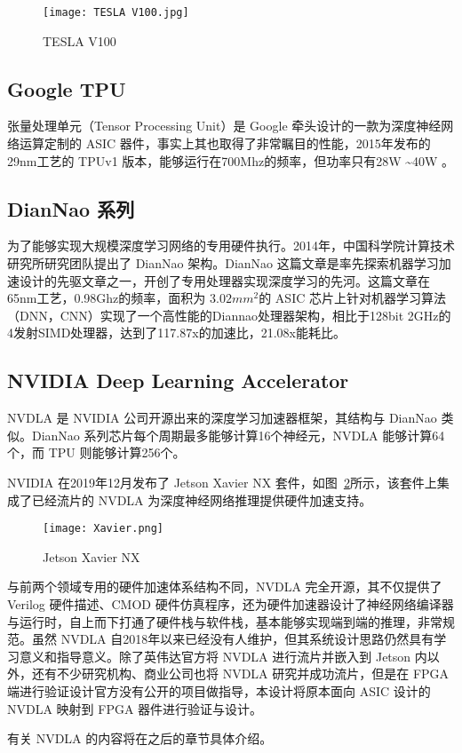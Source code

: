 \begin{figure}[!htbp]
    \centering
    \texttt{[image: TESLA V100.jpg]}
    \caption{TESLA V100}
    \label{fig:TESLA V100}
\end{figure}

\subsection{Google TPU}

张量处理单元（Tensor Processing Unit）是 Google 牵头设计的一款为深度神经网络运算定制的 ASIC 器件，事实上其也取得了非常瞩目的性能，2015年发布的29nm工艺的 TPUv1 版本，能够运行在700Mhz的频率，但功率只有28W \textasciitilde 40W \cite{DBLP:journals/corr/JouppiYPPABBBBB17}。

\subsection{DianNao 系列}

为了能够实现大规模深度学习网络的专用硬件执行。2014年，中国科学院计算技术研究所研究团队提出了 DianNao 架构。DianNao 这篇文章是率先探索机器学习加速设计的先驱文章之一，开创了专用处理器实现深度学习的先河。这篇文章在65nm工艺，0.98Ghz的频率，面积为 $ 3.02 mm^2 $的 ASIC 芯片上针对机器学习算法（DNN，CNN）实现了一个高性能的Diannao处理器架构，相比于128bit 2GHz的4发射SIMD处理器，达到了117.87x的加速比，21.08x能耗比。

\subsection{NVIDIA Deep Learning Accelerator}

NVDLA 是 NVIDIA 公司开源出来的深度学习加速器框架，其结构与 DianNao 类似。DianNao 系列芯片每个周期最多能够计算16个神经元，NVDLA 能够计算64个，而 TPU 则能够计算256个。

NVIDIA 在2019年12月发布了 Jetson Xavier NX 套件，如图~\ref{fig:Xavier NX}所示，该套件上集成了已经流片的 NVDLA 为深度神经网络推理提供硬件加速支持。

\begin{figure}[!htbp]
    \centering
    \texttt{[image: Xavier.png]}
    \caption{Jetson Xavier NX}
    \label{fig:Xavier NX}
\end{figure}

与前两个领域专用的硬件加速体系结构不同，NVDLA 完全开源，其不仅提供了 Verilog 硬件描述、CMOD 硬件仿真程序，还为硬件加速器设计了神经网络编译器与运行时，自上而下打通了硬件栈与软件栈，基本能够实现端到端的推理，非常规范。虽然 NVDLA 自2018年以来已经没有人维护，但其系统设计思路仍然具有学习意义和指导意义。除了英伟达官方将 NVDLA 进行流片并嵌入到 Jetson 内以外，还有不少研究机构、商业公司也将 NVDLA 研究并成功流片，但是在 FPGA 端进行验证设计官方没有公开的项目做指导，本设计将原本面向 ASIC 设计的 NVDLA 映射到 FPGA 器件进行验证与设计。

有关 NVDLA 的内容将在之后的章节具体介绍。
